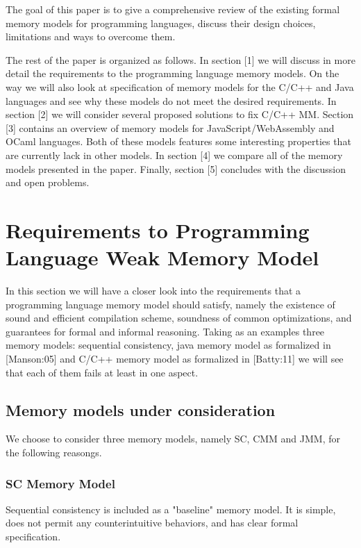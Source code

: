 \documentclass[a4paper,twoside,11pt]{article}
\numberwithin{equation}{section}
\begin{document}
The goal of this paper is to give a comprehensive review of 
the existing formal memory models for programming languages,
discuss their design choices, limitations and ways to overcome them.   

The rest of the paper is organized as follows.
In section [1] we will discuss in more detail the requirements to the programming language memory models.
On the way we will also look at specification of memory models for the C/C++ and Java languages
and see why these models do not meet the desired requirements.
In section [2] we will consider several proposed solutions to fix C/C++ MM. 
Section [3] contains an overview of memory models for JavaScript/WebAssembly and OCaml languages. 
Both of these models features some interesting properties that are currently lack in other models.
In section [4] we compare all of the memory models presented in the paper.
Finally, section [5] concludes with the discussion and open problems. 

\section{Requirements to Programming Language Weak Memory Model}

In this section we will have a closer look into the requirements 
that a programming language memory model should satisfy, 
namely the existence of sound and efficient compilation scheme, 
soundness of common optimizations, and guarantees for formal and informal reasoning.  
Taking as an examples three memory models: 
sequential consistency, java memory model as formalized in [Manson:05] 
and C/C++ memory model as formalized in [Batty:11]
we will see that each of them fails at least in one aspect.

\subsection{Memory models under consideration}

We choose to consider three memory models, namely SC, CMM and JMM, for the following reasongs.

\subsubsection{SC Memory Model}

Sequential consistency is included as a "baseline" memory model. 
It is simple, does not permit any counterintuitive behaviors,
and has clear formal specification.
\end{document}
